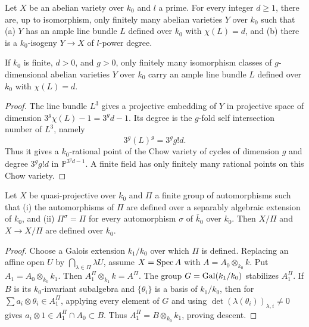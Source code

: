 \begin{convention}[Hypothesis $(k_0,X,l)$]
\label{mumford-appI-hypothesis}
Let $X$ be an abelian variety over $k_0$ and $l$ a prime. For every integer
$d\geq1$, there are, up to isomorphism, only finitely many abelian varieties
$Y$ over $k_0$ such that (a) $Y$ has an ample line bundle $L$ defined over
$k_0$ with $\chi(L)=d$, and (b) there is a $k_0$-isogeny $Y\to X$ of $l$-power
degree.
\end{convention}

\begin{lemma}
\label{mumford-lem-appI-finite-field-finiteness}
If $k_0$ is finite, $d>0$, and $g>0$, only finitely many isomorphism classes
of $g$-dimensional abelian varieties $Y$ over $k_0$ carry an ample line bundle
$L$ defined over $k_0$ with $\chi(L)=d$.
\end{lemma}
\begin{proof}
The line bundle $L^3$ gives a projective embedding of $Y$ in projective space
of dimension $3^g\chi(L)-1=3^gd-1$. Its degree is the $g$-fold self
intersection number of $L^3$, namely
\[
 3^g(L)^g=3^g g!d.
\]
Thus it gives a $k_0$-rational point of the Chow variety of cycles of
dimension $g$ and degree $3^gg!d$ in $\mathbb P^{3^gd-1}$. A finite field has
only finitely many rational points on this Chow variety.

\end{proof}


\begin{lemma}
\label{mumford-lem-appI-quotient-descent}
Let $X$ be quasi-projective over $k_0$ and $\Pi$ a finite group of
automorphisms such that (i) the automorphisms of $\Pi$ are defined over a
separably algebraic extension of $k_0$, and (ii) $\Pi^\sigma=\Pi$ for every
automorphism $\sigma$ of $\bar k_0$ over $k_0$. Then $X/\Pi$ and
$X\to X/\Pi$ are defined over $k_0$.
\end{lemma}
\begin{proof}
Choose a Galois extension $k_1/k_0$ over which $\Pi$ is defined. Replacing an
affine open $U$ by $\bigcap_{\lambda\in\Pi}\lambda U$, assume
$X={\rm Spec}\,A$ with $A=A_0\otimes_{k_0}k$. Put
$A_1=A_0\otimes_{k_0}k_1$. Then $A_1^\Pi\otimes_{k_1}k=A^\Pi$.
The group $G={\rm Gal}(k_1/k_0)$ stabilizes $A_1^\Pi$. If $B$ is its
$k_0$-invariant subalgebra and $\{\theta_i\}$ is a basis of $k_1/k_0$, then
for $\sum a_i\otimes\theta_i\in A_1^\Pi$, applying every element of $G$ and
using $\det(\lambda(\theta_i))_{\lambda,i}\ne0$ gives
$a_i\otimes1\in A_1^\Pi\cap A_0\subset B$. Thus
 $A_1^\Pi=B\otimes_{k_0}k_1$, proving descent.

\end{proof}


